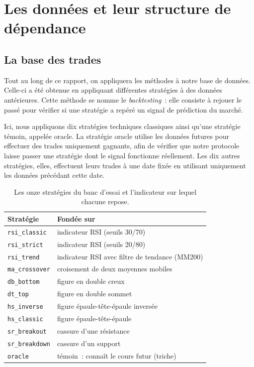 \chapter{Les données et leur structure de dépendance}
\label{chap:donnees}

\section{La base des trades}
\label{sec:donnees-trades}

Tout au long de ce rapport, on appliquera les méthodes à notre base de
données. Celle-ci a été obtenue en appliquant différentes stratégies à
des données antérieures. Cette méthode se nomme le \emph{backtesting}~:
elle consiste à rejouer le passé pour vérifier si une stratégie a repéré
un signal de prédiction du marché.

Ici, nous appliquons dix stratégies techniques classiques ainsi qu'une
stratégie témoin, appelée oracle. La stratégie oracle utilise les
données futures pour effectuer des trades uniquement gagnants, afin de
vérifier que notre protocole laisse passer une stratégie dont le signal
fonctionne réellement. Les dix autres stratégies, elles, effectuent
leurs trades à une date fixée en utilisant uniquement les données
précédant cette date.

\begin{table}[H]
\centering
\caption{Les onze stratégies du banc d'essai et l'indicateur sur lequel
chacune repose.}
\label{tab:strategies}
\renewcommand{\arraystretch}{1.25}
\small
\begin{tabular}{@{}ll@{}}
\toprule
Stratégie & Fondée sur \\
\midrule
\texttt{rsi\_classic}  & indicateur RSI (seuils 30/70) \\
\texttt{rsi\_strict}   & indicateur RSI (seuils 20/80) \\
\texttt{rsi\_trend}    & indicateur RSI avec filtre de tendance (MM200) \\
\texttt{ma\_crossover} & croisement de deux moyennes mobiles \\
\texttt{db\_bottom}    & figure en double creux \\
\texttt{dt\_top}       & figure en double sommet \\
\texttt{hs\_inverse}   & figure épaule-tête-épaule inversée \\
\texttt{hs\_classic}   & figure épaule-tête-épaule \\
\texttt{sr\_breakout}  & cassure d'une résistance \\
\texttt{sr\_breakdown} & cassure d'un support \\
\midrule
\texttt{oracle}        & témoin~: connaît le cours futur (triche) \\
\bottomrule
\end{tabular}
\end{table}

